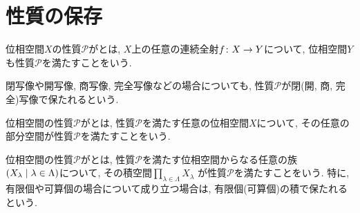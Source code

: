 \documentclass[uplatex, dvipdfmx, a4paper, 12pt, class=jsbook, crop=false]{standalone}
\begin{document}
\section{性質の保存}
\label{sec:preservation-of-properties}

\begin{definition}
	位相空間$ X $の性質$ \mathcal{P} $がとは,
	$ X $上の任意の連続全射$ f\colon X\to Y $について,
	位相空間$ Y $も性質$ \mathcal{P} $を満たすことをいう.
\end{definition}

閉写像や開写像, 商写像, 完全写像などの場合についても,
性質$ \mathcal{P} $が閉(開, 商, 完全)写像で保たれるという.

\begin{definition}
	位相空間の性質$ \mathcal{P} $がとは,
	性質$ \mathcal{P} $を満たす任意の位相空間$ X $について,
	その任意の部分空間が性質$ \mathcal{P} $を満たすことをいう.
\end{definition}

\begin{definition}
	位相空間の性質$ \mathcal{P} $がとは,
	性質$ \mathcal{P} $を満たす位相空間からなる任意の族
	$ \setfamily{X_\lambda}{\lambda \in \Lambda} $について,
	その積空間$ \prod_{\lambda \in \Lambda}  X_\lambda $
	が性質$ \mathcal{P} $を満たすことをいう.
	特に, 有限個や可算個の場合について成り立つ場合は,
	有限個(可算個)の積で保たれるという.
\end{definition}
\end{document}

